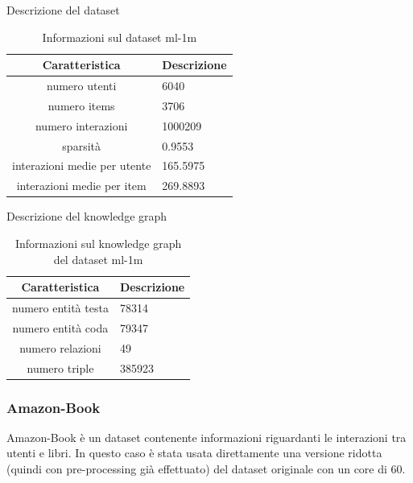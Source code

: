\noindent Descrizione del dataset
\begin{table}[H]
    \centering
    \footnotesize
    \begin{tabularx}{\textwidth}{|c|X|}
        \hline
        \textbf{Caratteristica} & \textbf{Descrizione} \\
        \hline
        numero utenti & 6040 \\
        \hline
        numero items & 3706 \\
        \hline
        numero interazioni & 1000209 \\
        \hline
        sparsità & 0.9553 \\
        \hline
        interazioni medie per utente & 165.5975 \\
        \hline
        interazioni medie per item & 269.8893 \\
        \hline
    \end{tabularx}
    \caption{Informazioni sul dataset ml-1m}
    \label{tab:dataset_info}
\end{table}

\noindent Descrizione del knowledge graph
\begin{table}[H]
    \centering
    \footnotesize
    \begin{tabularx}{\textwidth}{|c|X|}
        \hline
        \textbf{Caratteristica} & \textbf{Descrizione} \\
        \hline
        numero entità testa & 78314 \\
        \hline
        numero entità coda & 79347 \\
        \hline
        numero relazioni & 49 \\
        \hline
        numero triple & 385923 \\
        \hline
    \end{tabularx}
    \caption{Informazioni sul knowledge graph del dataset ml-1m}
    \label{tab:dataset_info}
\end{table}


\subsubsection{Amazon-Book}

\noindent Amazon-Book è un dataset contenente informazioni riguardanti le interazioni tra utenti e libri.
In questo caso è stata usata direttamente una versione ridotta (quindi con pre-processing già effettuato) del dataset originale con un core di 60.

